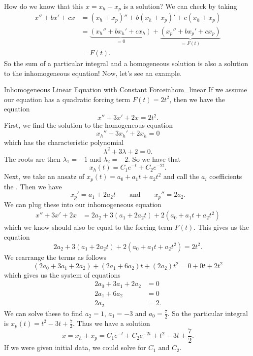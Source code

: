         How do we know that this $x=x_h+x_p$ is a solution? We can check by taking
        \begin{align*}
            x''+bx'+cx&=(x_h+x_p)''+b(x_h+x_p)'+c(x_h+x_p)\\
            &= \underbrace{(x_h''+bx_h'+cx_h)}_{=0}+\underbrace{(x_p''+bx_p'+cx_p)}_{=F(t)}\\
            &=F(t).
        \end{align*}
        So the sum of a particular integral and a homogeneous solution is also a solution to the inhomogeneous equation! Now, let's see an example.
        
        \begin{ex}{Inhomogeneous Linear Equation with Constant Force}{inhom_linear}
        If we assume our equation has a quadratic forcing term $F(t)=2t^2$, then we have the equation
        \[
        x''+3x'+2x=2t^2.
        \]
        First, we find the solution to the homogeneous equation
        \[
        x_h''+3x_h'+2x_h=0
        \]
        which has the characteristic polynomial
        \[
        \lambda^2+3\lambda+2=0.
        \]
        The roots are then $\lambda_1=-1$ and $\lambda_2=-2.$ So we have that
        \[
        x_h(t)=C_1e^{-t}+C_2e^{-2t}.
        \]
        Next, we take an ansatz of $x_p(t)=a_0+a_1t+a_2t^2$ and call the $a_i$ coefficients the .  Then we have
        \[
        x_p'=a_1+2a_2t \qquad \textrm{and} \qquad x_p''=2a_2.
        \]
        We can plug these into our inhomogeneous equation
        \begin{align*}
        x''+3x'+2x&= 2a_2+3(a_1+2a_2t)+2(a_0+a_1t+a_2t^2)
        \end{align*}
        which we know should also be equal to the forcing term $F(t)$.  This gives us the equation
        \[
        2a_2+3(a_1+2a_2t)+2(a_0+a_1t+a_2t^2)=2t^2.
        \]
        We rearrange the terms as follows
        \[
        (2a_0+3a_1+2a_2)+(2a_1+6a_2)t+(2a_2)t^2=0+0t+2t^2
        \]
        which gives us the system of equations
        \begin{align*}
            2a_0+3a_1+2a_2&=0\\
            2a_1+6a_2&=0\\
            2a_2&=2.
        \end{align*}
        We can solve these to find $a_2=1$, $a_1=-3$ and $a_0=\frac{7}{2}$. So the particular integral is $x_p(t)=t^2-3t+\frac{7}{2}$.  Thus we have a solution
        \[
        x=x_h+x_p=C_1e^{-t}+C_2e^{-2t}+t^2-3t+\frac{7}{2}.
        \]
        If we were given initial data, we could solve for $C_1$ and $C_2$.
        \end{ex}
        
